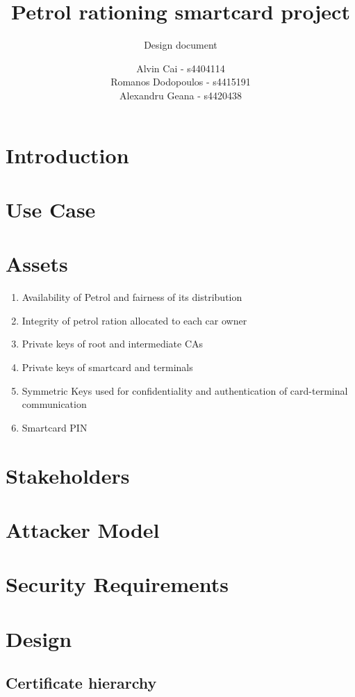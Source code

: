 \documentclass[a4paper,10pt]{llncs}
\title{Petrol rationing smartcard project}
\subtitle{Design document}
\author{Alvin Cai - s4404114 \\ Romanos Dodopoulos - s4415191 \\ Alexandru Geana - s4420438}
\institute{}
\begin{document}
\maketitle

\section{Introduction}


\section{Use Case}


\section{Assets}

\begin{enumerate}
  \item Availability of Petrol and fairness of its distribution
  \item Integrity of petrol ration allocated to each car owner
  \item Private keys of root and intermediate CAs
  \item Private keys of smartcard and terminals
  \item Symmetric Keys used for confidentiality and authentication of card-terminal communication
  \item Smartcard PIN 
\end{enumerate}

\section{Stakeholders}



\section{Attacker Model}


\section{Security Requirements}



\section{Design}
\subsection{Certificate hierarchy}
\end{document}
